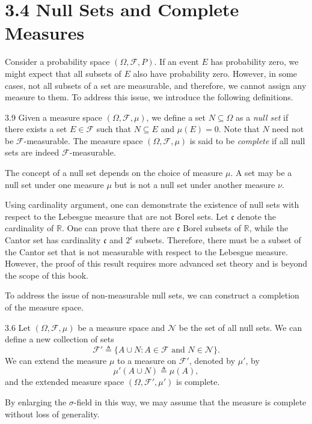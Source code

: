 \section*{3.4 Null Sets and Complete Measures}

Consider a probability space $(\Omega, \mathcal{F}, P)$. If an event $E$ has probability zero, we might expect that all subsets of $E$ also have probability zero. However, in some cases, not all subsets of a set are measurable, and therefore, we cannot assign any measure to them. To address this issue, we introduce the following definitions.

\begin{defbox}{3.9}
Given a measure space $(\Omega, \mathcal{F}, \mu)$, we define a set $N \subseteq \Omega$ as a \textit{null set} if there exists a set $E \in \mathcal{F}$ such that $N \subseteq E$ and $\mu(E) = 0$. Note that $N$ need not be $\mathcal{F}$-measurable. The measure space $(\Omega, \mathcal{F}, \mu)$ is said to be \textit{complete} if all null sets are indeed $\mathcal{F}$-measurable.
\end{defbox}

The concept of a null set depends on the choice of measure $\mu$. A set may be a null set under one measure $\mu$ but is not a null set under another measure $\nu$.

Using cardinality argument, one can demonstrate the existence of null sets with respect to the Lebesgue measure that are not Borel sets. Let $\mathfrak{c}$ denote the cardinality of $\mathbb{R}$. One can prove that there are $\mathfrak{c}$ Borel subsets of $\mathbb{R}$, while the Cantor set has cardinality $\mathfrak{c}$ and $2^{\mathfrak{c}}$ subsets. Therefore, there must be a subset of the Cantor set that is not measurable with respect to the Lebesgue measure. However, the proof of this result requires more advanced set theory and is beyond the scope of this book.

To address the issue of non-measurable null sets, we can construct a completion of the measure space.

\begin{thmbox}{3.6}
Let $(\Omega, \mathcal{F}, \mu)$ be a measure space and $\mathcal{N}$ be the set of all null sets. We can define a new collection of sets
\[
\mathcal{F}' \triangleq \{A \cup N : A \in \mathcal{F} \text{ and } N \in \mathcal{N}\}.
\]
We can extend the measure $\mu$ to a measure on $\mathcal{F}'$, denoted by $\mu'$, by
\[
\mu'(A \cup N) \triangleq \mu(A),
\]
and the extended measure space $(\Omega, \mathcal{F}', \mu')$ is complete.
\end{thmbox}

By enlarging the $\sigma$-field in this way, we may assume that the measure is complete without loss of generality.